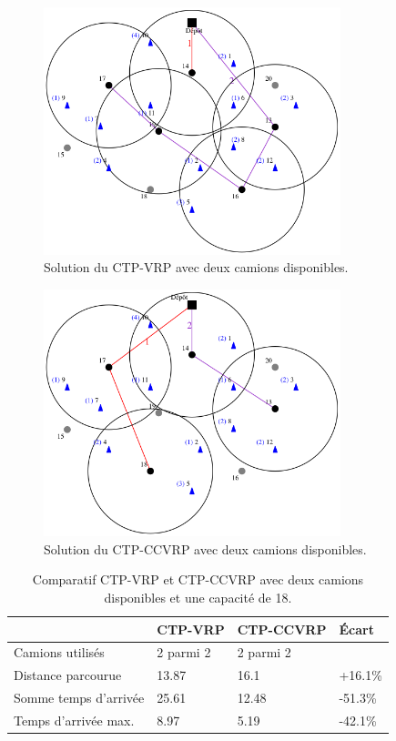 \documentclass[5p,authoryear]{elsarticle}
\begin{document}
\begin{figure}[p]\centering
	\centerline{\includegraphics[width=3.4in]{figures/ctp_deux_camions}}
	\caption[]{Solution du CTP-VRP avec deux camions disponibles.} \label{ctp_deux_camions}
\end{figure}

\begin{figure}[p] \centering
	\centerline{\includegraphics[width=3.4in]{figures/ctpccvrp_deux_camions}}
	\caption[]{Solution du CTP-CCVRP avec deux camions disponibles.} \label{ctpccvrp_deux_camions}
\end{figure}

\begin{table}[p] \centering \begin{tabular}{@{\small}llll@{}} \toprule %
 & {\footnotesize CTP-VRP} &  {\footnotesize CTP-CCVRP} & Écart \\ \midrule
Camions utilisés & 2 parmi 2 & 2 parmi 2 &  \\
Distance parcourue & 13.87 & 16.1 & +16.1\% \\
Somme temps d'arrivée & 25.61 & 12.48 & -51.3\% \\
Temps d'arrivée max. & 8.97 & 5.19 & -42.1\% \\ \bottomrule
\end{tabular} \caption{Comparatif CTP-VRP et CTP-CCVRP avec deux camions disponibles et une capacité de 18.} \label{table_deux_camions}
\end{table}
\end{document}
